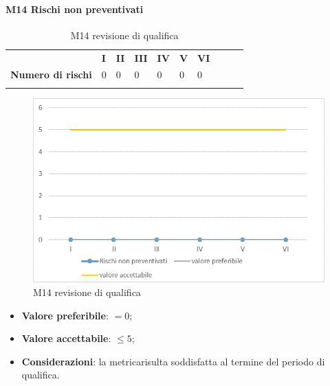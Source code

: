 \paragraph{M14 Rischi non preventivati} \mbox{}
\begin{longtable}[H!] {						
		>{}p{50mm}  		
		>{}p{8mm}
		>{}p{8mm}		
		>{}p{8mm}		
		>{}p{8mm}		
		>{}p{8mm}		
		>{}p{8mm}
		>{}p{8mm}
		>{}p{8mm}
		>{}p{8mm}
	}
	\rowcolor{gray!50}
	\textbf{} & \textbf{I} & \textbf{II} & \textbf{III} & \textbf{IV} & \textbf{V} & \textbf{VI} \TBstrut \\ [2mm]
	\textbf{Numero di rischi} & 0 & 0 & 0 & 0 & 0 & 0 \TBstrut \\ [2mm]
	\rowcolor{white}
	\caption{M14 revisione di qualifica}
\end{longtable}
\begin{figure}[H] 	
	\includegraphics[width=\linewidth]{./img/grafici/RQ14.png}	
	\caption{M14 revisione di qualifica}	
\end{figure}
\begin{itemize}
	\item \textbf{Valore preferibile}: $=0$;
	\item \textbf{Valore accettabile}: $\le 5$;
	\item \textbf{Considerazioni}: la metrica\glosp risulta soddisfatta al termine del periodo di qualifica.
\end{itemize}

